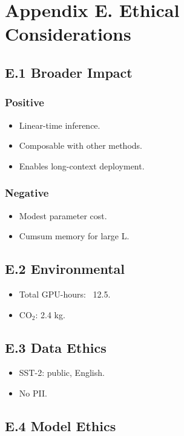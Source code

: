 \section{Appendix E. Ethical Considerations}

\subsection{E.1 Broader Impact}

\subsubsection{Positive}
\begin{itemize}
\item Linear-time inference.
\item Composable with other methods.
\item Enables long-context deployment.

\end{itemize}
\subsubsection{Negative}
\begin{itemize}
\item Modest parameter cost.
\item Cumsum memory for large L.

\end{itemize}
\subsection{E.2 Environmental}

\begin{itemize}
\item Total GPU-hours: ~12.5.
\item CO$_2$: 2.4 kg.

\end{itemize}
\subsection{E.3 Data Ethics}

\begin{itemize}
\item SST-2: public, English.
\item No PII.

\end{itemize}
\subsection{E.4 Model Ethics}

